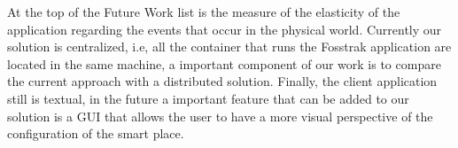 \documentclass{../llncs2e/llncs}
\begin{document}
At the top of the Future Work list is the measure of the elasticity of the application regarding
the events that occur in the physical world. Currently our solution is centralized, i.e, all the
container that runs the Fosstrak application are located in the same machine, a important component
of our work is to compare the current approach with a distributed solution. Finally, the client
application still is textual, in the future a important feature that can be added to our solution
is a GUI that allows the user to have a more visual perspective of the configuration of the smart
place.
%
%
\end{document}

